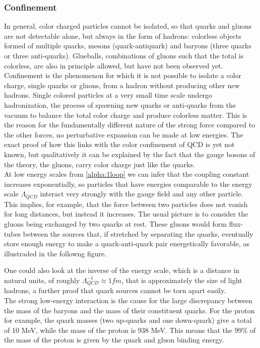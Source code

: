 \subsubsection{Confinement}
In general, color charged particles cannot be isolated, so that quarks and gluons are not detectable alone, but always in the form of hadrons: colorless objects formed of multiple quarks, mesons (quark-antiquark) and baryons (three quarks or three anti-quarks). Glueballs, combinations of gluons such that the total is colorless, are also in principle allowed, but have not been observed yet. Confinement is the phenomenon for which it is not possible to isolate a color charge, single quarks or gluons, from a hadron without producing other new hadrons. Single colored particles at a very small time scale undergo hadronization, the process of spawning new quarks or anti-quarks from the vacuum to balance the total color charge and produce colorless matter. This is the reason for the fundamentally different nature of the strong force compared to the other forces, no perturbative expansion can be made at low energies. The exact proof of how this links with the color confinement of QCD is yet not known, but qualitatively it can be explained by the fact that the gauge bosons of the theory, the gluons, carry color charge just like the quarks. \\
At low energy scales from \cref{alpha:1loop} we can infer that the coupling constant increases exponentially, so particles that have energies comparable to the energy scale $\Lambda_{QCD}$ interact very strongly with the gauge field and any other particle. This implies, for example, that the force between two particles does not vanish for long distances, but instead it increases. The usual picture is to consider the gluons being exchanged by two quarks at rest. These gluons would form flux-tubes between the sources that, if stretched by separating the quarks, eventually store enough energy to make a quark-anti-quark pair energetically favorable, as illustraded in the followng figure. 

One could also look at the inverse of the energy scale, which is a distance in natural units, of roughly $\Lambda_{QCD}^{-1} \approx 1 fm$, that is approximately the size of light hadrons, a further proof that quark sources cannot be torn apart easily.\\
The strong low-energy interaction is the cause for the large discrepancy between the mass of the baryons and the mass of their constituent quarks. For the proton for example, the quark masses (two up-quarks and one down-quark) give a total of 10 MeV, while the mass of the proton is 938 MeV. This means that the $99\%$ of the mass of the proton is given by the quark and gluon binding energy.


